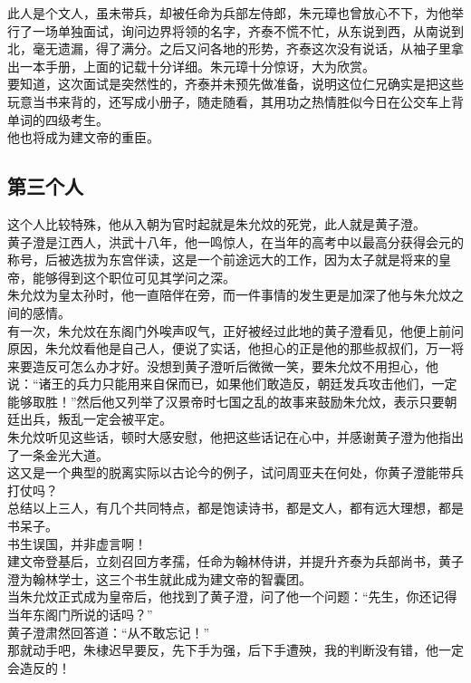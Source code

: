 \begin{multicols}{\theparacolNo}
此人是个文人，虽未带兵，却被任命为兵部左侍郎，朱元璋也曾放心不下，为他举行了一场单独面试，询问边界将领的名字，齐泰不慌不忙，从东说到西，从南说到北，毫无遗漏，得了满分。之后又问各地的形势，齐泰这次没有说话，从袖子里拿出一本手册，上面的记载十分详细。朱元璋十分惊讶，大为欣赏。\\

要知道，这次面试是突然性的，齐泰并未预先做准备，说明这位仁兄确实是把这些玩意当书来背的，还写成小册子，随走随看，其用功之热情胜似今日在公交车上背单词的四级考生。\\

他也将成为建文帝的重臣。\\

\subsection{第三个人}
这个人比较特殊，他从入朝为官时起就是朱允炆的死党，此人就是黄子澄。\\

黄子澄是江西人，洪武十八年，他一鸣惊人，在当年的高考中以最高分获得会元的称号，后被选拔为东宫伴读，这是一个前途远大的工作，因为太子就是将来的皇帝，能够得到这个职位可见其学问之深。\\

朱允炆为皇太孙时，他一直陪伴在旁，而一件事情的发生更是加深了他与朱允炆之间的感情。\\

有一次，朱允炆在东阁门外唉声叹气，正好被经过此地的黄子澄看见，他便上前问原因，朱允炆看他是自己人，便说了实话，他担心的正是他的那些叔叔们，万一将来要造反可怎么办才好。没想到黄子澄听后微微一笑，要朱允炆不用担心，他说：“诸王的兵力只能用来自保而已，如果他们敢造反，朝廷发兵攻击他们，一定能够取胜！”然后他又列举了汉景帝时七国之乱的故事来鼓励朱允炆，表示只要朝廷出兵，叛乱一定会被平定。\\

朱允炆听见这些话，顿时大感安慰，他把这些话记在心中，并感谢黄子澄为他指出了一条金光大道。\\

这又是一个典型的脱离实际以古论今的例子，试问周亚夫在何处，你黄子澄能带兵打仗吗？\\

总结以上三人，有几个共同特点，都是饱读诗书，都是文人，都有远大理想，都是书呆子。\\

书生误国，并非虚言啊！\\

建文帝登基后，立刻召回方孝孺，任命为翰林侍讲，并提升齐泰为兵部尚书，黄子澄为翰林学士，这三个书生就此成为建文帝的智囊团。\\

当朱允炆正式成为皇帝后，他找到了黄子澄，问了他一个问题：“先生，你还记得当年东阁门所说的话吗？”\\

黄子澄肃然回答道：“从不敢忘记！”\\

那就动手吧，朱棣迟早要反，先下手为强，后下手遭殃，我的判断没有错，他一定会造反的！\\
\ifnum{}
	\end{multicols}
\fi
\newpage
